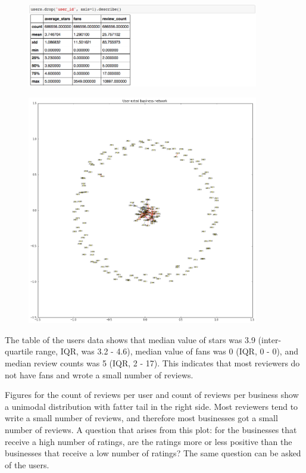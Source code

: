 \documentclass[11pt]{article}
\begin{document}
\begin{figure}[H]
\centering
\includegraphics[width=0.9\textwidth]{./ac209/userdescribe.png}
\end{figure}

\begin{figure}[H]
\centering
\includegraphics[width=0.9\textwidth]{./ac209/networkanalysis.png}
\end{figure}

\par The table of the users data shows that median value of stars was 3.9 (inter-quartile range, IQR, was 3.2 - 4.6), median value of fans was 0 (IQR, 0 - 0), and median review counts was 5 (IQR, 2 - 17). This indicates that most reviewers do not have fans and wrote a small number of reviews.

\par Figures for the count of reviews per user and count of reviews per business show a unimodal distribution with fatter tail in the right side. Most reviewers tend to write a small number of reviews, and therefore most businesses got a small number of reviews. A question that arises from this plot: for the businesses that receive a high number of ratings, are the ratings more or less positive than the businesses that receive a low number of ratings? The same question can be asked of the users.
\end{document}
